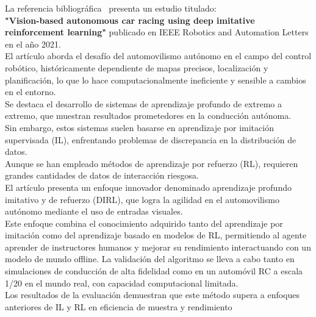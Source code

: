 \documentclass[10pt,letterpaper,final]{article}
\begin{document}
\begin{longtable}
        \hline
        \noindent La referencia bibliográfica~\cite{cai2021vision} presenta un estudio titulado:\\
        \textbf{"Vision-based autonomous car racing using deep imitative reinforcement learning"}
        publicado en IEEE Robotics and Automation Letters en el año 2021.                                                                 \\ El artículo aborda el desafío del automovilismo autónomo
        en el campo del control robótico, históricamente dependiente de mapas precisos, localización y planificación, lo que lo hace
        computacionalmente ineficiente y sensible a cambios en el entorno.                                                                \\
        Se destaca el desarrollo de sistemas de aprendizaje profundo de extremo a extremo, que muestran resultados prometedores en la conducción
        autónoma.                                                                                                                         \\ Sin embargo, estos sistemas suelen basarse en aprendizaje por imitación supervisada (IL), enfrentando problemas de discrepancia
        en la distribución de datos.                                                                                                      \\ Aunque se han empleado métodos de aprendizaje por refuerzo (RL), requieren grandes cantidades de datos de interacción riesgosa.
        \\ El artículo presenta un enfoque innovador denominado aprendizaje profundo imitativo y de refuerzo (DIRL), que logra la agilidad en
        el automovilismo autónomo mediante el uso de entradas visuales.                                                                              \\
        Este enfoque combina el conocimiento adquirido tanto del aprendizaje por imitación como del aprendizaje basado en modelos de RL,
        permitiendo al agente aprender de instructores humanos y mejorar su rendimiento interactuando con un modelo de mundo offline.
        La validación del algoritmo se lleva a cabo tanto en simulaciones de conducción de alta fidelidad como en un automóvil RC a escala 1/20 en
        el mundo real, con capacidad computacional limitada. \\
        Los resultados de la evaluación demuestran que este método supera a enfoques anteriores de IL y RL en eficiencia de muestra y rendimiento

\end{longtable}
\end{document}
